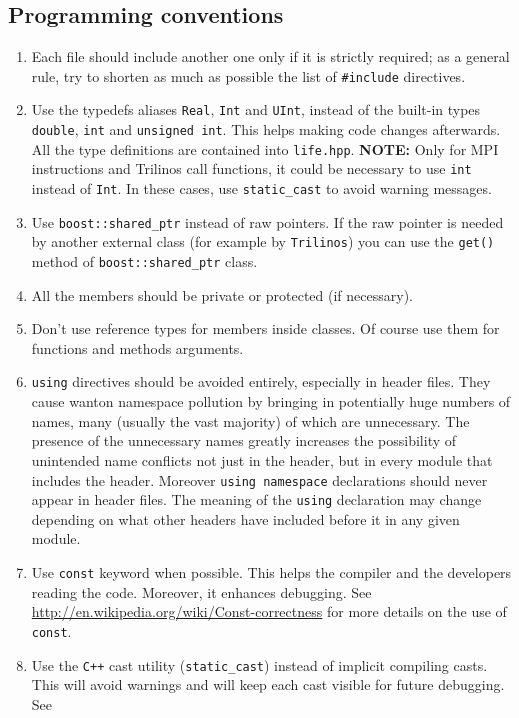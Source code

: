 \documentclass[10p]{article}
\begin{document}
\subsection{Programming conventions}
\begin{enumerate}
  \item Each file should include another one only if it is strictly required; as a general rule, try to shorten as much as possible the list of \texttt{\#include} directives.
  \item Use the typedefs aliases \texttt{Real}, \texttt{Int} and \texttt{UInt}, instead of the built-in types \texttt{double}, \texttt{int} and \texttt{unsigned int}. This helps making code changes afterwards. All the type definitions are contained into \texttt{life.hpp}. \newline \textbf{NOTE:} Only for MPI instructions and Trilinos call functions, it could be necessary to use \texttt{int} instead of \texttt{Int}. In these cases, use \texttt{static\_cast} to avoid warning messages.
  \item Use \texttt{boost::shared\_ptr} instead of raw pointers. If the raw pointer is needed by another external class (for example by \texttt{Trilinos}) you can use the \texttt{get()} method of \texttt{boost::shared\_ptr} class.
  \item All the members should be private or protected (if necessary).
  \item Don't use reference types for members inside classes. Of course use them for functions and methods arguments.
  \item \texttt{using} directives should be avoided entirely, especially in header files. They cause wanton namespace pollution by bringing in potentially huge numbers of names, many (usually the vast majority) of which are unnecessary. The presence of the unnecessary names greatly increases the possibility of unintended name conflicts not just in the header, but in every module that includes the header. Moreover
  \texttt{using namespace} declarations should never appear in header files. The meaning of the \texttt{using} declaration may change depending on what other headers have included before it in any given module.
  \item Use \texttt{const} keyword when possible. This helps the compiler and the developers reading the code. Moreover, it enhances debugging. See \url{http://en.wikipedia.org/wiki/Const-correctness} for more details on the use of \texttt{const}.
  \item Use the \texttt{C++} cast utility (\texttt{static\_cast}) instead of implicit compiling casts. This will avoid warnings and will keep each cast visible for future debugging. See

\end{enumerate}
\end{document}
